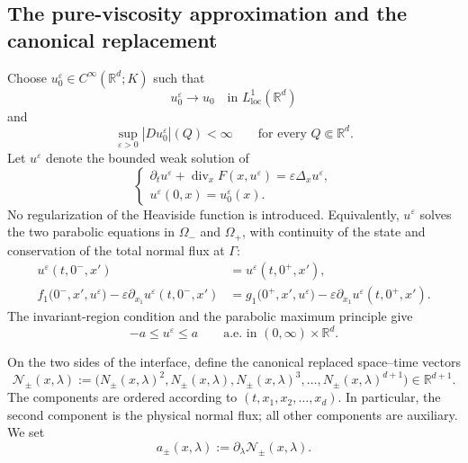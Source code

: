 \documentclass[11pt]{amsart}
\numberwithin{equation}{section}
\theoremstyle{plain}
\theoremstyle{definition}
\theoremstyle{remark}
\begin{document}
\subsection{The pure-viscosity approximation and the canonical replacement}
\label{subsec:flat-viscosity}

Choose \(u_0^\varepsilon\in C^\infty(\mathbb R^d;K)\) such that
\[
    u_0^\varepsilon\longrightarrow u_0
    \quad\text{in }L^1_{\mathrm{loc}}(\mathbb R^d)
\]
and
\[
    \sup_{\varepsilon>0}|Du_0^\varepsilon|(Q)<\infty
    \qquad
    \text{for every }Q\Subset\mathbb R^d.
\]
Let \(u^\varepsilon\) denote the bounded weak solution of
\begin{equation}
\label{eq:flat-viscous-problem}
\begin{cases}
    \partial_tu^\varepsilon
    +\operatorname{div}_xF(x,u^\varepsilon)
    =\varepsilon\Delta_xu^\varepsilon,
\\[1mm]
    u^\varepsilon(0,x)=u_0^\varepsilon(x).
\end{cases}
\end{equation}
No regularization of the Heaviside function is introduced. Equivalently,
\(u^\varepsilon\) solves the two parabolic equations in \(\Omega_-\) and
\(\Omega_+\), with continuity of the state and conservation of the total
normal flux at \(\Gamma\):
\begin{equation}
\label{eq:flat-viscous-transmission}
\begin{aligned}
    u^\varepsilon(t,0^-,x')
    &=u^\varepsilon(t,0^+,x'),
\\
    f_1\bigl(0^-,x',u^\varepsilon\bigr)
    -\varepsilon\partial_{x_1}u^\varepsilon(t,0^-,x')
    &=
    g_1\bigl(0^+,x',u^\varepsilon\bigr)
    -\varepsilon\partial_{x_1}u^\varepsilon(t,0^+,x').
\end{aligned}
\end{equation}
The invariant-region condition and the parabolic maximum principle give
\begin{equation}
\label{eq:flat-viscous-bound}
    -a\leq u^\varepsilon\leq a
    \qquad
    \text{a.e. in }(0,\infty)\times\mathbb R^d.
\end{equation}

On the two sides of the interface, define the canonical replaced
space--time vectors
\begin{equation}
\label{eq:flat-canonical-replacements}
    \mathcal N_\pm(x,\lambda)
    :=
    \bigl(
        N_\pm(x,\lambda)^2,
        N_\pm(x,\lambda),
        N_\pm(x,\lambda)^3,\ldots,
        N_\pm(x,\lambda)^{d+1}
    \bigr)
    \in\mathbb R^{d+1}.
\end{equation}
The components are ordered according to \((t,x_1,x_2,\ldots,x_d)\). In
particular, the second component is the physical normal flux; all other
components are auxiliary. We set
\[
    a_\pm(x,\lambda):=\partial_\lambda\mathcal N_\pm(x,\lambda).
\]
\end{document}
